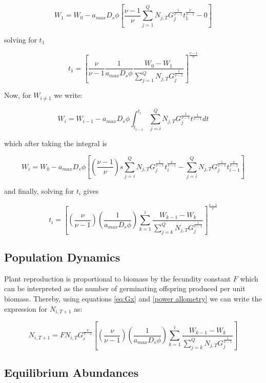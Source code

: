 \documentclass{article}
\begin{document}
  $$ W_{1} =  W_{0} - a_{max}D_{s}\phi \left[ \frac{\nu - 1}{\nu}\sum_{j = 1}^{Q}N_{j, T}G_{j}^{\frac{1}{\nu-1}}t_{1}^{\frac{\nu}{\nu-1}}  - 0\right] $$

  solving for $t_{1}$

  \begin{equation} \label{eq:t1}
    t_{1} = \left[ \frac{\nu}{\nu-1} \frac{1}{a_{max}D_{s}\phi} \frac{W_{0} - W_{1}}{\sum_{j=1}^{Q}N_{j, T}G_{j}^{\frac{1}{\nu - 1}}} \right]^{\frac{\nu - 1}{\nu}}
  \end{equation}

  Now, for $W_{i \neq 1}$ we write:

  $$ W_{i} =  W_{i-1} - a_{max}D_{s}\phi \int_{t_{i-1}}^{t_{i}} \! \sum_{j = i}^{Q}N_{j, T}G_{j}^{\frac{1}{\nu-1}}t^{\frac{1}{\nu-1}}dt$$

  which after taking the integral is

  $$ W_{i} =  W_{0} - a_{max}D_{s}\phi \left[ (\frac{\nu - 1}{\nu}) s\sum_{j = i}^{Q}N_{j, T}G_{j}^{\frac{1}{\nu-1}}t_{i}^{\frac{\nu}{\nu-1}}  -  \sum_{j = i}^{Q}N_{j, T}G_{j}^{\frac{1}{\nu-1}}t_{i-1}^{\frac{\nu}{\nu-1}}\right] $$

  and finally, solving for $t_{i}$ gives

  \begin{equation} \label{eq:ti}
    t_{i} = \left[ (\frac{\nu}{\nu-1}) (\frac{1}{a_{max}D_{s}\phi}) \sum_{k = 1}^{i}\frac{W_{k -1} - W_{k}}{\sum_{j=k}^{Q}N_{j, T}G_{j}^{\frac{1}{\nu - 1}}} \right]^{\frac{\nu - 1}{\nu}}
  \end{equation}

  \subsection{Population Dynamics}

  Plant reproduction is proportional to biomass by the fecundity constant $F$
  which can be interpreted as the number of germinating offspring produced per
  unit biomass. Thereby, using equations \ref{eq:Gx} and \ref{power allometry}
  we can write the expression for $N_{i, T+1}$ as:

  \begin{equation} \label{eq:NT+1}
    N_{i, T+1} = F N_{i, T} G_{i}^{\frac{\nu}{\nu - 1}}\left[ (\frac{\nu}{\nu-1})(\frac{1}{a_{max}D_{s}\phi}) \sum_{k = 1}^{i}\frac{W_{k -1} - W_{k}}{\sum_{j=k}^{Q}N_{j, T}G_{j}^{\frac{1}{\nu - 1}}} \right]
  \end{equation}

  \subsection{Equilibrium Abundances}
\end{document}
